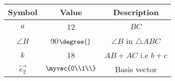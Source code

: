 \begin{tabular}{|c|c|c|}
  \hline
  \textbf{Symbol}&\textbf{Value}&\textbf{Description}\\
  \hline
  $a$ & 12 & $BC$\\
  \hline
  $\angle{B}$ & 90$\degree{}$ & $\angle{B}$ in $\triangle$$ABC$ \\
  \hline
  $k$ & 18 & $AB+AC$ i.e $b+c$ \\
  \hline 
  $\vec{e_2}$ & $\myvec{0\\1\\}$ & Basis vector\\
  \hline   
\end{tabular}\\
